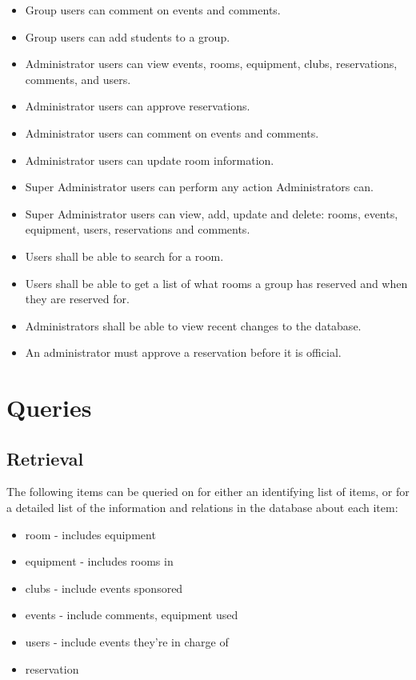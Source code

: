 \documentclass{article}
\begin{document}
\begin{itemize}
\item Group users can comment on events and comments.
\item Group users can add students to a group.
\item Administrator users can view events, rooms, equipment, clubs, reservations, comments, and users.
\item Administrator users can approve reservations.
\item Administrator users can comment on events and comments.
\item Administrator users can update room information.
\item Super Administrator users can perform any action Administrators can.
\item Super Administrator users can view, add, update and delete: rooms, events, equipment, users, reservations and comments.
\item Users shall be able to search for a room.
\item Users shall be able to get a list of what rooms a group has
reserved and when they are reserved for.
\item Administrators shall be able to view recent changes to the database.
\item An administrator must approve a reservation before it is official.
\end{itemize}

\section{Queries}
\subsection{Retrieval}

The following items can be queried on for either an identifying list of items,
or for a detailed list of the information and relations in the database about each item:
\begin{itemize}
\item room - includes equipment
\item equipment - includes rooms in
\item clubs - include events sponsored 
\item events - include comments, equipment used
\item users - include events they're in charge of
\item reservation 
\end{itemize}
\end{document}
